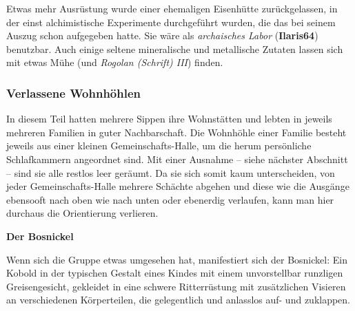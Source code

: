 Etwas mehr Ausrüstung wurde einer ehemaligen Eisenhütte zurückgelassen, in der einst alchimistische Experimente durchgeführt wurden, die das \fkv bei seinem Auszug schon aufgegeben hatte.
Sie wäre als \emph{archaisches Labor} (\textbf{Ilaris64}) benutzbar.
Auch einige seltene mineralische und metallische Zutaten lassen sich mit etwas Mühe (und \emph{Rogolan (Schrift) III}) finden.


\subsubsection{Verlassene Wohnhöhlen}
In diesem Teil hatten mehrere Sippen ihre Wohnstätten und lebten in jeweils mehreren Familien in guter Nachbarschaft.
Die Wohnhöhle einer Familie besteht jeweils aus einer kleinen Gemeinschafts-Halle, um die herum persönliche Schlafkammern angeordnet sind.
Mit einer Ausnahme -- siehe nächster Abschnitt -- sind sie alle restlos leer geräumt.
Da sie sich somit kaum unterscheiden, von jeder Gemeinschafts-Halle mehrere Schächte abgehen und diese wie die Ausgänge ebensooft nach oben wie nach unten oder ebenerdig verlaufen, kann man hier durchaus die Orientierung verlieren.

\textbf{Der Bosnickel}



Wenn sich die Gruppe etwas umgesehen hat, manifestiert sich der Bosnickel:
Ein Kobold in der typischen Gestalt eines Kindes mit einem unvorstellbar runzligen Greisengesicht, gekleidet in eine schwere Ritterrüstung mit zusätzlichen Visieren an verschiedenen Körperteilen, die gelegentlich und anlasslos auf- und zuklappen.


